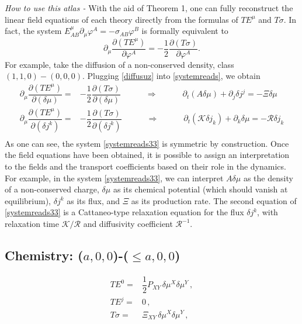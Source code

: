 \documentclass[aps,prl,singlecolumn,nofootinbib]{revtex4-2}
\newcommand{\spc}{\quad \quad \quad}
\theoremstyle{definition}
\theoremstyle{theorem}
\begin{document}
\noindent \textit{How to use this atlas -} With the aid of Theorem 1, one can fully reconstruct the linear field equations of each theory directly from the formulas of $TE^\mu$ and $T\sigma$. In fact, the system $E^\mu_{AB}\partial_\mu \varphi^A = -\sigma_{AB}\varphi^B$ is formally equivalent to \cite{GavassinoNonHydro2022}
\begin{equation}\label{systemreads}
    \partial_\mu \dfrac{\partial (TE^\mu)}{\partial \varphi^A} = -\dfrac{1}{2} \dfrac{\partial (T\sigma)}{\partial \varphi^A}.
\end{equation}
For example, take the diffusion of a non-conserved density, class $(1,1,0)-(0,0,0)$. Plugging \eqref{diffusuz} into \eqref{systemreads}, we obtain
\begin{equation}\label{systemreads33}
\begin{split}
    \partial_\mu \dfrac{\partial (TE^\mu)}{\partial (\delta \mu)} ={}& -\dfrac{1}{2} \dfrac{\partial (T\sigma)}{\partial (\delta \mu)} \spc \Longrightarrow \spc \partial_t (A \delta \mu) + \partial_j \delta j^j =-\Xi \delta \mu \\
    \partial_\mu \dfrac{\partial (TE^\mu)}{\partial (\delta j^k)} ={}& -\dfrac{1}{2} \dfrac{\partial (T\sigma)}{\partial (\delta j^k)} \spc \Longrightarrow \spc \partial_t (\mathcal{K} \delta j_k) + \partial_k \delta \mu =-\mathcal{R} \delta j_k\\
    \end{split}
\end{equation}
As one can see, the system \eqref{systemreads33} is symmetric by construction. Once the field equations have been obtained, it is possible to assign an interpretation to the fields and the transport coefficients based on their role in the dynamics. For example, in the system \eqref{systemreads33}, we can interpret $A\delta \mu$ as the density of a non-conserved charge, $\delta \mu$ as its chemical potential (which should vanish at equilibrium), $\delta j^k$ as its flux, and $\Xi$ as its production rate. The second equation of \eqref{systemreads33} is a Cattaneo-type relaxation equation for the flux $\delta j^k$, with relaxation time $\mathcal{K}/\mathcal{R}$ and diffusivity coefficient $\mathcal{R}^{-1}$.



\subsection*{Chemistry: ($a,0,0$)-($\leq a, 0,0$)}

\begin{equation}
\begin{split}
TE^0 ={}& \dfrac{1}{2} P_{XY} \, \delta \mu^X \delta \mu^Y \, ,  \\
TE^j ={}& 0 \, , \\
T\sigma ={}& \Xi_{XY} \, \delta \mu^X \delta \mu^Y \, , \\
\end{split}
\end{equation}
\end{document}
